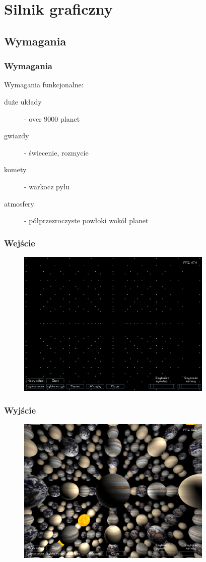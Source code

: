 \documentclass{beamer}
\begin{document}
\section{Silnik graficzny}\label{sec:silnik graficzny}

\subsection{Wymagania}\label{sub:wymagania}

\frame
{
	\frametitle{Wymagania}

	Wymagania funkcjonalne:
		\begin{description}
	\item[duże układy] - over 9000 planet
		\item[gwiazdy] - świecenie, rozmycie
		\item[komety] - warkocz pyłu
		\item[atmosfery] - półprzezroczyste powłoki wokół planet
		\end{description}
}

\frame
{
	\frametitle{Wejście}
	\begin{figure}
	\centering
		\includegraphics[height=7cm]{img/r_points.png}
	\label{fig:deferred_rednering}
	\end{figure}
}

\frame
{
	\frametitle{Wyjście}
	\begin{figure}
	\centering
		\includegraphics[height=7cm]{img/r_curr.png}
	\label{fig:deferred_rednering}
	\end{figure}

}
\end{document}
